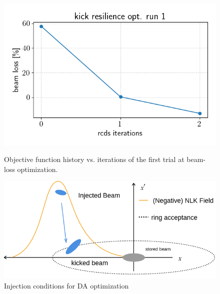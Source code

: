 \begin{figure}
    \begin{minipage}{0.48\textwidth}
        \centering
    \includegraphics[width=\columnwidth]{Images/beam_loss_hist_run1.png}
    \caption{Objective function history vs. iterations of the first trial at beam-loss optimization.}
    \label{beam_loss_hist}
    \end{minipage}
    \hfill
    \begin{minipage}{0.48\textwidth}
        \centering
        \includegraphics[width=\columnwidth]{Images/inj_cond.png}
        \caption{Injection conditions for DA optimization}
        \label{fig:inj_cond}
    \end{minipage}
\end{figure}


